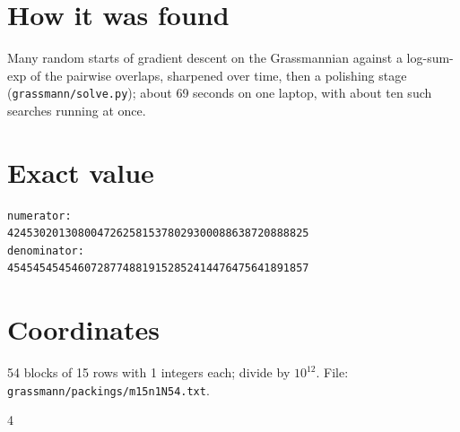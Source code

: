 \documentclass[11pt,a4paper]{article}
\begin{document}
\section{How it was found}
Many random starts of gradient descent on the Grassmannian against a log-sum-exp of the pairwise overlaps, sharpened over time, then a polishing stage (\texttt{grassmann/solve.py}); about 69 seconds on one laptop, with about ten such searches running at once.


\appendix
\section{Exact value}
{\small
\begin{verbatim}
numerator:
42453020130800472625815378029300088638720888825
denominator:
45454545454607287748819152852414476475641891857
\end{verbatim}}

\section{Coordinates}
54 blocks of 15 rows with 1 integers each; divide by $10^{12}$. File: \texttt{grassmann/packings/m15n1N54.txt}.
{\tiny
\begin{multicols}{4}
\end{multicols}}
\end{document}
